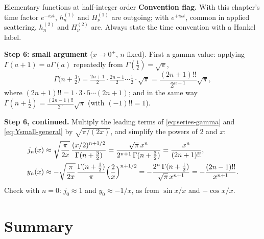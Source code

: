 \documentclass[11pt]{beamer}
\begin{document}
\begin{frame}[allowframebreaks=1.00]{Elementary functions at half-integer order}
\textbf{Convention flag.} With this chapter's time factor \(e^{-i\omega t}\), \(h_n^{(1)}\) and \(H_\nu^{(1)}\) are outgoing;
with \(e^{+i\omega t}\), common in applied scattering, \(h_n^{(2)}\) and \(H_\nu^{(2)}\) are. Always state the time
convention with a Hankel label.

\textbf{Step 6: small argument} (\(x\to0^+\), \(n\) fixed). First a gamma value: applying \(\Gamma(a+1)=a\Gamma(a)\)
repeatedly from \(\Gamma(\frac12)=\sqrt\pi\),
\[
 \Gamma\bigl(n+\tfrac32\bigr)=\tfrac{2n+1}{2}\cdot\tfrac{2n-1}{2}\cdots\tfrac12\cdot\sqrt\pi=\frac{(2n+1)!!}{2^{n+1}}\sqrt\pi,
\]
where \((2n+1)!!=1\cdot3\cdot5\cdots(2n+1)\);
and in the same way \(\Gamma(n+\frac12)=\frac{(2n-1)!!}{2^n}\sqrt\pi\) (with \((-1)!!=1\)).


\textbf{Step 6, continued.} Multiply the leading terms of \eqref{eq:series-gamma} and \eqref{eq:Ysmall-general} by
\(\sqrt{\pi/(2x)}\), and simplify the powers of \(2\) and \(x\):
\begin{align*}
 j_n(x)&\approx\sqrt{\frac{\pi}{2x}}\,\frac{(x/2)^{n+1/2}}{\Gamma(n+\tfrac32)}
 =\frac{\sqrt\pi\,x^n}{2^{n+1}\,\Gamma(n+\tfrac32)}=\frac{x^n}{(2n+1)!!},\\
 y_n(x)&\approx-\sqrt{\frac{\pi}{2x}}\,\frac{\Gamma(n+\tfrac12)}{\pi}\Bigl(\frac2x\Bigr)^{n+1/2}
 =-\frac{2^n\,\Gamma(n+\tfrac12)}{\sqrt\pi\,x^{n+1}}=-\frac{(2n-1)!!}{x^{n+1}}.
\end{align*}
Check with \(n=0\): \(j_0\approx1\) and \(y_0\approx-1/x\), as from \(\sin x/x\) and \(-\cos x/x\).
\end{frame}

\section{Summary}
\end{document}
